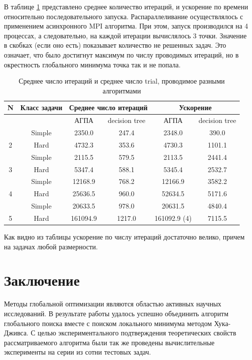 \documentclass{svproc}
\begin{document}
В таблице \ref{tab:2} представлено среднее количество итераций, и ускорение по времени относительно последовательного запуска. Распараллеливание  осуществлялось с применением асинхронного MPI алгоритма. При этом, запуск производился на 4 процессах, а следовательно, на каждой итерации вычислялось 3 точки. Значение в скобках (если оно есть) показывает количество не решенных задач. Это означает, что было достигнут максимум по числу проводимых итераций, но в окрестность глобального минимума точка так и не попала.



\begin{table}[h!]
    \caption{Среднее число итераций и среднее число trial, проводимое разными алгоритмами}
    \label{tab:2}
    \centering
    \begin{tabular}{|c|c|c|c|c|c|}
    \hline
	
        N & Класс задачи & \multicolumn{2}{c|}{Среднее число итераций} & \multicolumn{2}{c|}{Ускорение} \\ \hline
          & ~ & АГПА & decision tree & АГПА & decision tree \\ \hline
          & Simple & 2350.0 & 247.4 & 2348.0 & 390.0  \\ \hline
        2  & Hard & 4732.3 & 353.6 & 4730.3 & 1101.1  \\ \hline
          & Simple & 2115.5 & 579.5 & 2113.5 & 2441.4  \\ \hline
        3  & Hard & 5347.4 & 588.1 & 5345.4 & 2532.7  \\ \hline
          & Simple & 12168.9 & 768.2 & 12166.9 & 3582.2  \\ \hline
        4  & Hard & 25636.5 & 960.0 & 52634.5 & 5171.6  \\ \hline
          & Simple & 20633.5 & 978.0 & 20631.5 & 4840.4  \\ \hline
        5  & Hard & 161094.9 & 1217.0 & 161092.9 (4) & 7115.5  \\ \hline
    \end{tabular}
\end{table}

Как видно из таблицы ускорение по числу итераций достаточно велико, причем на задачах любой размерности. 

\section{Заключение}

Методы глобальной оптимизации являются областью активных научных исследований.  В результате работы удалось успешно объединить алгоритм глобального поиска вместе с поиском локального минимума методом Хука-Дживса. С целью экспериментального подтверждения теоретических свойств рассматриваемого алгоритма были так же проведены вычислительные эксперименты на серии из сотни тестовых задач. 
\end{document}
